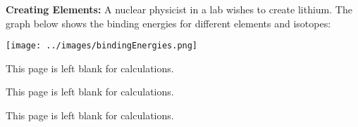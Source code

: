 \documentclass[addpoints,12pt]{exam}
\begin{document}
\begin{questions}
\bonusquestion[2] \textbf{Creating Elements:} A nuclear physicist in a lab wishes to create lithium. The graph below shows the binding energies for different elements and isotopes:
\noindent\begin{center}
\texttt{[image: ../images/bindingEnergies.png]}
\end{center}
\end{questions}

\clearpage
This page is left blank for calculations.

\clearpage
This page is left blank for calculations.

\clearpage
This page is left blank for calculations.
\end{document}
